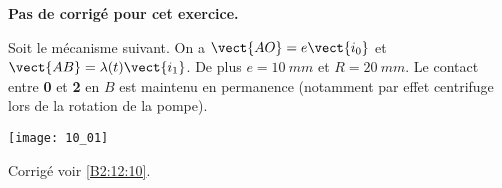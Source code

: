 \normalfalse \difficiletrue \tdifficilefalse
\correctionfalse


\setcounter{numques}{0}
\ifcorrection
\else
\textbf{Pas de corrigé pour cet exercice.}
\fi

\ifprof
\else
Soit le mécanisme suivant. On a $\vect{AO}=e\vect{i_0}$ et $\vect{AB}=\lambda(t)\vect{i_1}$. De plus $e=\SI{10}{mm}$ et $R=\SI{20}{mm}$. Le contact entre \textbf{0} et \textbf{2} en $B$ est maintenu en permanence (notamment par effet centrifuge lors de la rotation de la pompe).
\begin{center}
\texttt{[image: 10\_01]}
\end{center}
\fi

\ifprof
\else
\fi

\ifprof
\else
\fi


\ifprof
\else
\fi



\ifprof
\else
\begin{flushright}
\footnotesize{Corrigé  voir \ref{B2:12:10}.}
\end{flushright}%
\fi